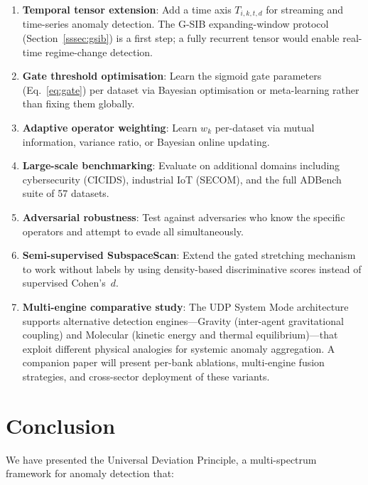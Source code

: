 \documentclass[journal]{IEEEtran}
\begin{document}
\begin{enumerate}
  \item \textbf{Temporal tensor extension}: Add a time axis $T_{i,k,t,d}$ for streaming and time-series anomaly detection.  The G-SIB expanding-window protocol (Section~\ref{sssec:gsib}) is a first step; a fully recurrent tensor would enable real-time regime-change detection.
  \item \textbf{Gate threshold optimisation}: Learn the sigmoid gate parameters (Eq.~\eqref{eq:gate}) per dataset via Bayesian optimisation or meta-learning rather than fixing them globally.
  \item \textbf{Adaptive operator weighting}: Learn $w_k$ per-dataset via mutual information, variance ratio, or Bayesian online updating.
  \item \textbf{Large-scale benchmarking}: Evaluate on additional domains including cybersecurity (CICIDS), industrial IoT (SECOM), and the full ADBench~\cite{han2022adbench} suite of 57 datasets.
  \item \textbf{Adversarial robustness}: Test against adversaries who know the specific operators and attempt to evade all simultaneously.
  \item \textbf{Semi-supervised SubspaceScan}: Extend the gated stretching mechanism to work without labels by using density-based discriminative scores instead of supervised Cohen's~$d$.
  \item \textbf{Multi-engine comparative study}: The UDP System Mode architecture supports alternative detection engines---Gravity (inter-agent gravitational coupling) and Molecular (kinetic energy and thermal equilibrium)---that exploit different physical analogies for systemic anomaly aggregation.  A companion paper will present per-bank ablations, multi-engine fusion strategies, and cross-sector deployment of these variants.
\end{enumerate}

\section{Conclusion}
\label{sec:conclusion}

We have presented the Universal Deviation Principle, a multi-spectrum framework for anomaly detection that:
\end{document}
